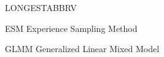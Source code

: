 \begin{theglossary}{LONGESTABBRV}

\item[ESM] Experience Sampling Method
\item[GLMM] Generalized Linear Mixed Model

\end{theglossary}
